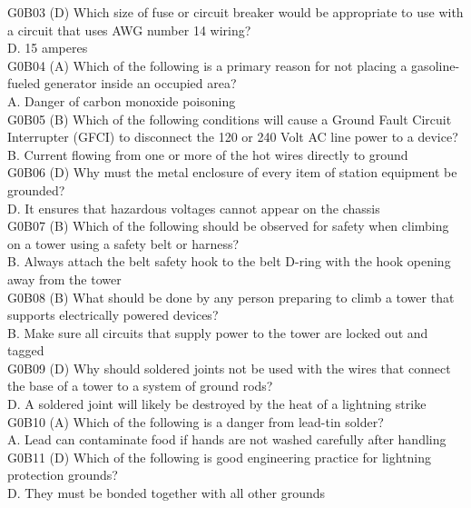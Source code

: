 \documentclass[12pt,letterpaper]{report}
\begin{document}
G0B03 (D) Which size of fuse or circuit breaker would be appropriate to use with a circuit that uses AWG number 14 wiring? \\
D. 15 amperes\\

G0B04 (A) Which of the following is a primary reason for not placing a gasoline-fueled generator inside an occupied area?\\
A. Danger of carbon monoxide poisoning\\

G0B05 (B) Which of the following conditions will cause a Ground Fault Circuit Interrupter (GFCI) to disconnect the 120 or 240 Volt AC line power to a device?\\
B. Current flowing from one or more of the hot wires directly to ground\\

G0B06 (D)  Why must the metal enclosure of every item of station equipment be grounded?\\
D. It ensures that hazardous voltages cannot appear on the chassis\\

G0B07 (B) Which of the following should be observed for safety when climbing on a tower using a safety belt or harness?\\
B. Always attach the belt safety hook to the belt D-ring with the hook opening away from the tower\\

G0B08 (B) What should be done by any person preparing to climb a tower that supports electrically powered devices?\\
B. Make sure all circuits that supply power to the tower are locked out and tagged\\

G0B09 (D) Why should soldered joints not be used with the wires that connect the base of a tower to a system of ground rods?\\
D. A soldered joint will likely be destroyed by the heat of a lightning strike\\

G0B10 (A) Which of the following is a danger from lead-tin solder?\\
A. Lead can contaminate food if hands are not washed carefully after handling\\

G0B11 (D) Which of the following is good engineering practice for lightning protection grounds?\\
D. They must be bonded together with all other grounds\\
\end{document}
